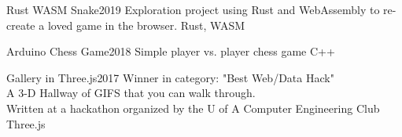 
\begin{projects}
    \project
    {Rust WASM Snake}{2019}
    {}
    {Exploration project using Rust and WebAssembly to re-create a loved game in the browser.}
    {Rust, WASM}

    \project
    {Arduino Chess Game}{2018}
    {}
    {Simple player vs. player chess game}
    {C++}

	\project
	{Gallery in Three.js}{2017}
	{}
	{
            Winner in category: "Best Web/Data Hack"\\
            A 3-D Hallway of GIFS that you can walk through.\\
            Written at a hackathon organized by the U of A Computer Engineering Club 
    }
    {Three.js}
				

\end{projects}
